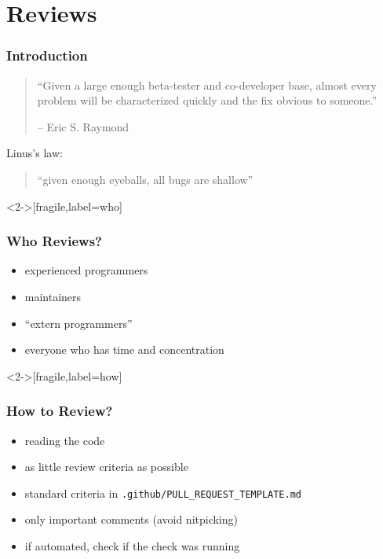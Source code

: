 \section{Reviews}

\begin{frame}
	\frametitle{Introduction}

	\begin{quote}
	``Given a large enough beta-tester and co-developer base, almost every problem will be characterized quickly and the fix obvious to someone.''

	-- Eric S. Raymond
	\end{quote}

	\pause
	\vspace{2cm}

	Linus's law:
	\begin{quote}
	``given enough eyeballs, all bugs are shallow''
	\end{quote}

	\vspace{1cm}
\end{frame}

\begin{frame}<2->[fragile,label=who]
	\frametitle{Who Reviews?}

	\pause

	\begin{itemize}[<+-| alert@+>]
	\item experienced programmers
	\item maintainers
	\item ``extern programmers''
	\item everyone who has time and concentration
	\end{itemize}
\end{frame}

\begin{frame}<2->[fragile,label=how]
	\frametitle{How to Review?}

	\pause

	\begin{itemize}[<+-| alert@+>]
	\item reading the code
	\item as little review criteria as possible
	\item standard criteria in \verb+.github/PULL_REQUEST_TEMPLATE.md+
	\item only important comments (avoid nitpicking)
	\item if automated, check if the check was running
	\end{itemize}
\end{frame}


